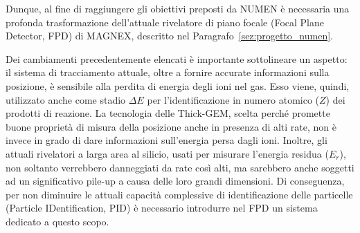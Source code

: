 Dunque, al fine di raggiungere gli obiettivi preposti da NUMEN è necessaria una profonda trasformazione dell'attuale rivelatore di piano focale (Focal Plane Detector, FPD) di MAGNEX, descritto nel Paragrafo~\ref{sez:progetto_numen}.


Dei cambiamenti precedentemente elencati è importante sottolineare un aspetto: il sistema di tracciamento attuale, oltre a fornire accurate informazioni sulla posizione, è sensibile alla perdita di energia degli ioni nel gas. Esso viene, quindi, utilizzato anche come stadio $\Delta E$ per l'identificazione in numero atomico ($Z$) dei prodotti di reazione.
La tecnologia delle Thick-GEM, scelta perché promette buone proprietà di misura della posizione anche in presenza di alti rate, non è invece in grado di dare informazioni sull'energia persa dagli ioni.
Inoltre, gli attuali rivelatori a larga area al silicio, usati per misurare l'energia residua ($ E_r $), non soltanto verrebbero danneggiati da rate così alti, ma sarebbero anche soggetti ad un significativo pile-up a causa delle loro grandi dimensioni.
Di conseguenza, per non diminuire le attuali capacità complessive di identificazione delle particelle (Particle IDentification, PID) è necessario introdurre nel FPD un sistema dedicato a questo scopo.



\subsection{} \label{sez:sistema_identif_part}


